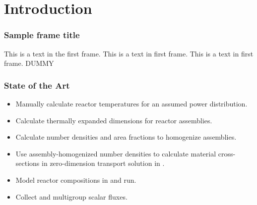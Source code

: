 \section{Introduction}
\label{sec:introduction}

\begin{frame}
  \frametitle{Sample frame title}
  This is a text in the first frame. This is a text in first frame. This is a
  text in first frame. DUMMY
\end{frame}

\begin{frame}
  \frametitle{State of the Art}
  \begin{itemize}
    \item Manually calculate reactor temperatures for an assumed power
      distribution.
    \item Calculate thermally expanded dimensions for reactor assemblies.
    \item Calculate number densities and area fractions to homogenize
      assemblies.
    \item Use assembly-homogenized number densities to calculate material
      cross-sections in zero-dimension transport solution in \mcc.
    \item Model reactor compositions in \dif and run.
    \item Collect \keff and multigroup scalar fluxes.
  \end{itemize}
\end{frame}
